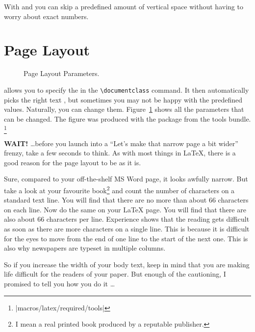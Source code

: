 With  and  you can skip a predefined amount of
vertical space without having to worry about exact numbers.


\section{Page Layout}

\begin{figure}[!hp]
\begin{center}
\makeatletter\@mylayout\makeatother
\end{center}
\vspace*{1.8cm}
\caption{Page Layout Parameters.}
\label{fig:layout}
\end{figure}
\LaTeXe{} allows you to specify the  in the
\verb|\documentclass| command. It then automatically picks the right 
text , but sometimes you may not be happy with 
the predefined values. Naturally, you can change them. 
\thispagestyle{fancyplain}
Figure~\ref{fig:layout} shows all the parameters that can be changed.
The figure was produced with the  package from the tools bundle.%
\footnote{\CTANref|macros/latex/required/tools|}

\textbf{WAIT!} \ldots before you launch into a ``Let's make that
narrow page a bit wider'' frenzy, take a few seconds to think. As with
most things in \LaTeX, there is a good reason for the page layout to
be as it is.

Sure, compared to your off-the-shelf MS Word page, it looks awfully
narrow. But take a look at your favourite book\footnote{I mean a real
  printed book produced by a reputable publisher.} and count the number
of characters on a standard text line. You will find that there are no
more than about 66 characters on each line. Now do the same on your
\LaTeX{} page. You will find that there are also about 66 characters
per line.  Experience shows that the reading gets difficult as soon as
there are more characters on a single line. This is because it is
difficult for the eyes to move from the end of one line to the start of the next one.
This is also why newspapers are typeset in multiple columns.

So if you increase the width of your body text, keep in mind that you
are making life difficult for the readers of your paper. But enough
of the cautioning, I promised to tell you how you do it \ldots
 

